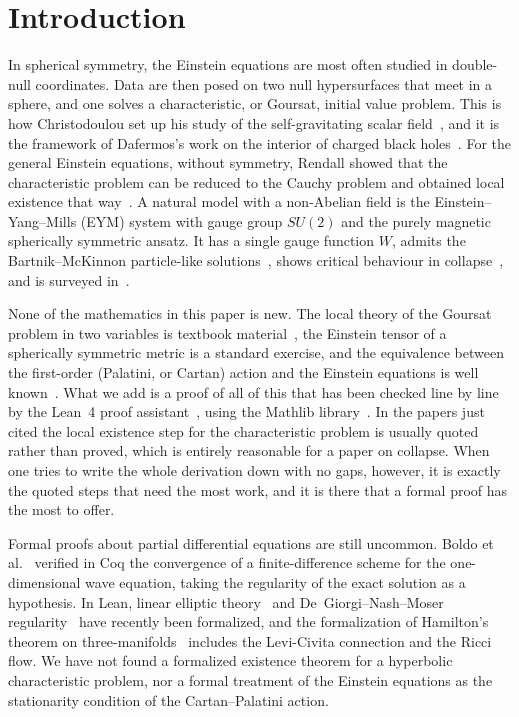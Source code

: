 \documentclass{lmcs}
\begin{document}
\section{Introduction}\label{sec:intro}

In spherical symmetry, the Einstein equations are most often studied in double-null coordinates. Data are then posed on two null hypersurfaces that meet in a sphere, and one solves a characteristic, or Goursat, initial value problem. This is how Christodoulou set up his study of the self-gravitating scalar field~\cite{Christodoulou1986,Christodoulou1993}, and it is the framework of Dafermos's work on the interior of charged black holes~\cite{Dafermos2005}. For the general Einstein equations, without symmetry, Rendall showed that the characteristic problem can be reduced to the Cauchy problem and obtained local existence that way~\cite{Rendall1990}. A natural model with a non-Abelian field is the Einstein--Yang--Mills (EYM) system with gauge group $SU(2)$ and the purely magnetic spherically symmetric ansatz. It has a single gauge function $W$, admits the Bartnik--McKinnon particle-like solutions~\cite{BartnikMcKinnon1988}, shows critical behaviour in collapse~\cite{ChoptuikChmajBizon1996}, and is surveyed in~\cite{VolkovGaltsov1999}.

None of the mathematics in this paper is new. The local theory of the Goursat problem in two variables is textbook material~\cite{Garabedian1964,CourantHilbert1962}, the Einstein tensor of a spherically symmetric metric is a standard exercise, and the equivalence between the first-order (Palatini, or Cartan) action and the Einstein equations is well known~\cite{Peldan1994,Wald1984}. What we add is a proof of all of this that has been checked line by line by the Lean~4 proof assistant~\cite{deMouraUllrich2021}, using the Mathlib library~\cite{mathlib2020}. In the papers just cited the local existence step for the characteristic problem is usually quoted rather than proved, which is entirely reasonable for a paper on collapse. When one tries to write the whole derivation down with no gaps, however, it is exactly the quoted steps that need the most work, and it is there that a formal proof has the most to offer.

Formal proofs about partial differential equations are still uncommon. Boldo et al.~\cite{Boldo2014} verified in Coq the convergence of a finite-difference scheme for the one-dimensional wave equation, taking the regularity of the exact solution as a hypothesis. In Lean, linear elliptic theory~\cite{SotoFrancoMarshallStevens2026} and De~Giorgi--Nash--Moser regularity~\cite{ArmstrongKempe2026} have recently been formalized, and the formalization of Hamilton's theorem on three-manifolds~\cite{ChowLiaoQin2026} includes the Levi-Civita connection and the Ricci flow. We have not found a formalized existence theorem for a hyperbolic characteristic problem, nor a formal treatment of the Einstein equations as the stationarity condition of the Cartan--Palatini action.
\end{document}
